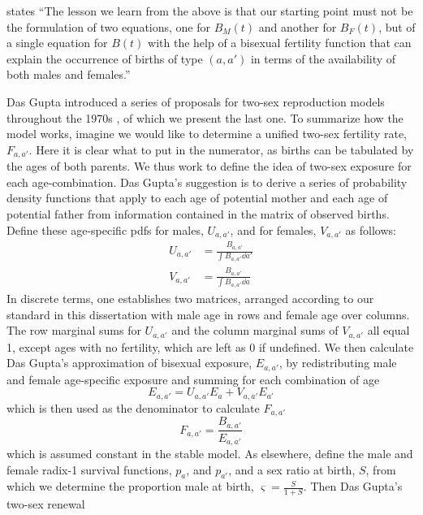 \FloatBarrier
\label{sec:dasgupta}
\citet{gupta1978alternative} states ``The lesson we learn from the above is that
our starting point must not be the formulation of two equations, one for $B_M(t)$ and another for
$B_F(t)$, but of a single equation for $B(t)$ with the help of a bisexual
fertility function that can explain the occurrence of births of type $(a,a')$ in
terms of the availability of both males and females.''

Das Gupta introduced a series of proposals for two-sex reproduction models
throughout the 1970s \citep{gupta1972two, gupta1973us,
gupta1976interactive, gupta1978alternative}, of which we present the last
one. To summarize how the model works, imagine we would like to determine a
unified two-sex fertility rate, $F_{a,a'}$. Here it is clear
what to put in the numerator, as births can be tabulated by the ages of both parents.
 We thus work to define the idea of two-sex exposure for each age-combination. Das Gupta's
suggestion is to derive a series of probability density functions that apply to
each age of potential mother and each age of potential father from information
contained in the matrix of observed births. Define these age-specific pdfs for
males, $U_{a,a'}$, and for females, $V_{a,a'}$ as follows:
\begin{align}
U_{a,a'} &= \frac{B_{a,a'}}{\int B_{a,a'} \dd a'}\\
V_{a,a'} &= \frac{B_{a,a'}}{\int B_{a,a'} \dd a}
\end{align}
In discrete terms, one establishes two matrices, arranged according to our
standard in this dissertation with male age in rows and female age over columns.
The row marginal sums for $U_{a,a'}$ and the column marginal sums of
$V_{a,a'}$ all equal 1, except ages with no fertility, which are left as 0 if
undefined. We then calculate Das Gupta's approximation of bisexual exposure, $E_{a,a'}$, by redistributing male and
female age-specific exposure and summing for each combination of age
\begin{equation}
E_{a,a'} = U_{a,a'}E_a + V_{a,a'}E_{a'}
\end{equation}
which is then used as the denominator to calculate $F_{a,a'}$
\begin{equation}
F_{a,a'} = \frac{B_{a,a'}}{E_{a,a'}}
\end{equation}
which is assumed constant in the stable model. As elsewhere, define the
male and female radix-1 survival functions, $p_a$, and $p_{a'}$, and a sex ratio
at birth, $S$, from which we determine the proportion male at
birth, $\varsigma=\frac{S}{1+S}$. Then Das Gupta's two-sex renewal
